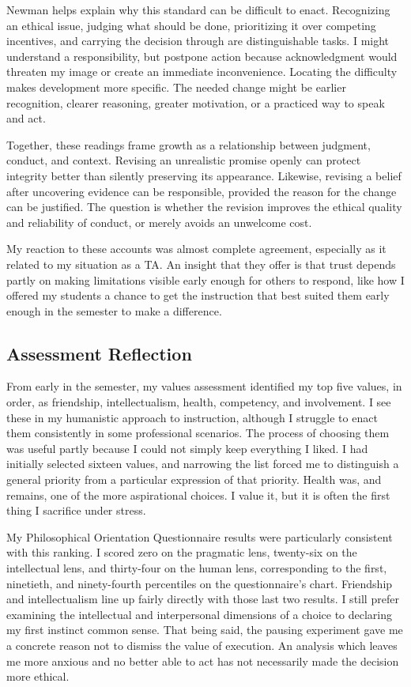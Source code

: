 \documentclass[12pt,stu,biblatex]{apa7}
\begin{document}
Newman \parencite[ch. 1]{Newman2019building} helps explain why this standard can be difficult to enact.
Recognizing an ethical issue, judging what should be done, prioritizing it over competing incentives, and carrying the decision through are distinguishable tasks.
I might understand a responsibility, but postpone action because acknowledgment would threaten my image or create an immediate inconvenience.
Locating the difficulty makes development more specific.
The needed change might be earlier recognition, clearer reasoning, greater motivation, or a practiced way to speak and act.

Together, these readings frame growth as a relationship between judgment, conduct, and context.
Revising an unrealistic promise openly can protect integrity better than silently preserving its appearance.
Likewise, revising a belief after uncovering evidence can be responsible, provided the reason for the change can be justified.
The question is whether the revision improves the ethical quality and reliability of conduct, or merely avoids an unwelcome cost.

My reaction to these accounts was almost complete agreement, especially as it related to my situation as a TA.
An insight that they offer is that trust depends partly on making limitations visible early enough for others to respond, like how I offered my students a chance to get the instruction that best suited them early enough in the semester to make a difference.

\subsection{Assessment Reflection}
From early in the semester, my values assessment identified my top five values, in order, as friendship, intellectualism, health, competency, and involvement.
I see these in my humanistic approach to instruction, although I struggle to enact them consistently in some professional scenarios.
The process of choosing them was useful partly because I could not simply keep everything I liked.
I had initially selected sixteen values, and narrowing the list forced me to distinguish a general priority from a particular expression of that priority.
Health was, and remains, one of the more aspirational choices.
I value it, but it is often the first thing I sacrifice under stress.

My Philosophical Orientation Questionnaire results were particularly consistent with this ranking.
I scored zero on the pragmatic lens, twenty-six on the intellectual lens, and thirty-four on the human lens, corresponding to the first, ninetieth, and ninety-fourth percentiles on the questionnaire's chart.
Friendship and intellectualism line up fairly directly with those last two results.
I still prefer examining the intellectual and interpersonal dimensions of a choice to declaring my first instinct common sense.
That being said, the pausing experiment gave me a concrete reason not to dismiss the value of execution.
An analysis which leaves me more anxious and no better able to act has not necessarily made the decision more ethical.
\end{document}
